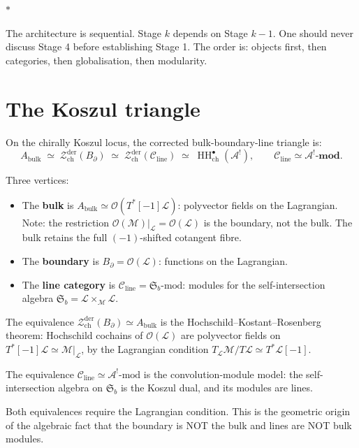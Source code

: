 \documentclass[11pt]{article}
\newcommand{\cA}{\mathcal{A}}
\newcommand{\cC}{\mathcal{C}}
\newcommand{\cM}{\mathcal{M}}
\newcommand{\cO}{\mathcal{O}}
\newcommand{\cZ}{\mathcal{Z}}
\newcommand{\cL}{\mathcal{L}}
\newcommand{\HH}{\operatorname{HH}}
\newcommand{\Zder}{\cZ^{\mathrm{der}}_{\mathrm{ch}}}
\newcommand{\sep}{\bigskip\begin{center}$*$\end{center}\medskip}
\begin{document}
\sep

The architecture is sequential.  Stage $k$ depends on Stage $k-1$.
One should never discuss Stage 4 before establishing Stage 1.
The order is: objects first, then categories, then globalisation,
then modularity.


\section{The Koszul triangle}
\label{sec:koszul-triangle}

On the chirally Koszul locus, the corrected bulk-boundary-line
triangle is:
\begin{equation}\label{eq:triangle-wn}
A_{\mathrm{bulk}}
\;\simeq\;
\Zder(B_\partial)
\;\simeq\;
\Zder(\cC_{\mathrm{line}})
\;\simeq\;
\HH^\bullet_{\mathrm{ch}}(\cA^!),
\qquad
\cC_{\mathrm{line}} \simeq \cA^!\text{-}\mathbf{mod}.
\end{equation}

Three vertices:
\begin{itemize}[nosep]
\item The \textbf{bulk} is
  $A_{\mathrm{bulk}} \simeq \cO(T^*[-1]\cL)$: polyvector fields
  on the Lagrangian.  Note: the restriction
  $\cO(\cM)|_\cL = \cO(\cL)$ is the boundary, not the bulk.
  The bulk retains the full $(-1)$-shifted cotangent fibre.
\item The \textbf{boundary} is $B_\partial = \cO(\cL)$: functions
  on the Lagrangian.
\item The \textbf{line category} is
  $\cC_{\mathrm{line}} = \mathfrak{S}_b\text{-mod}$: modules for
  the self-intersection algebra
  $\mathfrak{S}_b = \cL \times_\cM \cL$.
\end{itemize}

The equivalence $\Zder(B_\partial) \simeq A_{\mathrm{bulk}}$ is
the Hochschild--Kostant--Rosenberg theorem: Hochschild cochains of
$\cO(\cL)$ are polyvector fields on $T^*[-1]\cL \simeq \cM|_\cL$,
by the Lagrangian condition
$T_\cL\cM / T\cL \simeq T^*\cL[-1]$.

The equivalence $\cC_{\mathrm{line}} \simeq \cA^!\text{-mod}$ is
the convolution-module model: the self-intersection algebra on
$\mathfrak{S}_b$ is the Koszul dual, and its modules are lines.

Both equivalences require the Lagrangian condition.  This is the
geometric origin of the algebraic fact that the boundary is NOT
the bulk and lines are NOT bulk modules.
\end{document}
